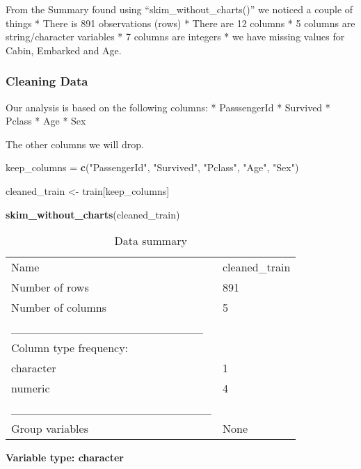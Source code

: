\documentclass[
]{article}
\newenvironment{Shaded}{\begin{snugshade}}{\end{snugshade}}
\newcommand{\FunctionTok}[1]{\textcolor[rgb]{0.13,0.29,0.53}{\textbf{#1}}}
\newcommand{\NormalTok}[1]{#1}
\newcommand{\OtherTok}[1]{\textcolor[rgb]{0.56,0.35,0.01}{#1}}
\newcommand{\StringTok}[1]{\textcolor[rgb]{0.31,0.60,0.02}{#1}}
\begin{document}
From the Summary found using ``skim\_without\_charts()'' we noticed a
couple of things * There is 891 observations (rows) * There are 12
columns * 5 columns are string/character variables * 7 columns are
integers * we have missing values for Cabin, Embarked and Age.

\hypertarget{cleaning-data}{%
\subsubsection{\texorpdfstring{\textbf{Cleaning
Data}}{Cleaning Data}}\label{cleaning-data}}

Our analysis is based on the following columns: * PasssengerId *
Survived * Pclass * Age * Sex

The other columns we will drop.

\begin{Shaded}
\begin{Highlighting}[]
\NormalTok{keep\_columns }\OtherTok{=} \FunctionTok{c}\NormalTok{(}\StringTok{"PassengerId"}\NormalTok{, }\StringTok{"Survived"}\NormalTok{, }\StringTok{"Pclass"}\NormalTok{, }\StringTok{"Age"}\NormalTok{, }\StringTok{"Sex"}\NormalTok{)}

\NormalTok{cleaned\_train }\OtherTok{\textless{}{-}}\NormalTok{ train[keep\_columns]}

\FunctionTok{skim\_without\_charts}\NormalTok{(cleaned\_train)}
\end{Highlighting}
\end{Shaded}

\begin{longtable}[]{@{}ll@{}}
\caption{Data summary}\tabularnewline
\toprule\noalign{}
\endfirsthead
\endhead
\bottomrule\noalign{}
\endlastfoot
Name & cleaned\_train \\
Number of rows & 891 \\
Number of columns & 5 \\
\_\_\_\_\_\_\_\_\_\_\_\_\_\_\_\_\_\_\_\_\_\_\_ & \\
Column type frequency: & \\
character & 1 \\
numeric & 4 \\
\_\_\_\_\_\_\_\_\_\_\_\_\_\_\_\_\_\_\_\_\_\_\_\_ & \\
Group variables & None \\
\end{longtable}

\textbf{Variable type: character}
\end{document}
